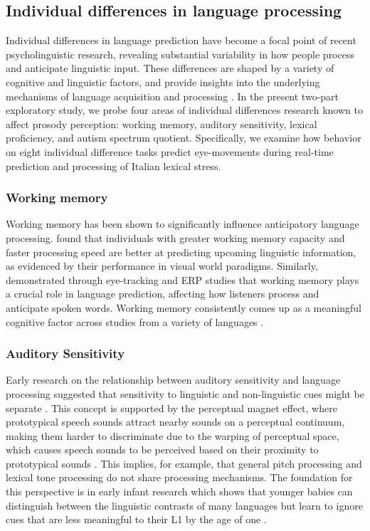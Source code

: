 \subsection{Individual differences in language processing}

Individual differences in language prediction have become a focal point of recent psycholinguistic research, revealing substantial variability in how people process and anticipate linguistic input. These differences are shaped by a variety of cognitive and linguistic factors, and provide insights into the underlying mechanisms of language acquisition and processing \citep{Huettig2016, Li2023, Kidd2018}. In the present two-part exploratory study, we probe four areas of individual differences research known to affect prosody perception: working memory, auditory sensitivity, lexical proficiency, and autism spectrum quotient. Specifically, we examine how behavior on eight individual difference tasks predict eye-movements during real-time prediction and processing of Italian lexical stress.

\subsubsection{Working memory}
Working memory has been shown to significantly influence anticipatory language processing. \cite{Huettig2016} found that individuals with greater working memory capacity and faster processing speed are better at predicting upcoming linguistic information, as evidenced by their performance in visual world paradigms. Similarly, \cite{Li2023} demonstrated through eye-tracking and ERP studies that working memory plays a crucial role in language prediction, affecting how listeners process and anticipate spoken words. Working memory consistently comes up as a meaningful cognitive factor across studies from a variety of languages \citep{mchaney_et_al_2021_workingmemory, goss_2014, hadar_2016}. 

\subsubsection{Auditory Sensitivity}
Early research on the relationship between auditory sensitivity and language processing suggested that sensitivity to linguistic and non-linguistic cues might be separate \citep{werker_lalonde_1988}. This concept is supported by the perceptual magnet effect, where prototypical speech sounds attract nearby sounds on a perceptual continuum, making them harder to discriminate due to the warping of perceptual space, which causes speech sounds to be perceived based on their proximity to prototypical sounds \cite{kuhl_1991}. This implies, for example, that general pitch processing and lexical tone processing do not share processing mechanisms. The foundation for this perspective is in early infant research which shows that younger babies can distinguish between the linguistic contrasts of many languages but learn to ignore cues that are less meaningful to their L1 by the age of one \citep{aslin_1983}.


